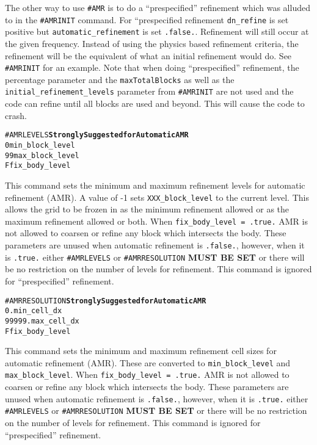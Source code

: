 The other way to use {\tt \#AMR} is to do a ``prespecified'' refinement which was
alluded to in the {\tt \#AMRINIT} command.  For ``prespecified refinement 
 {\tt dn\_refine} is set positive but
{\tt automatic\_refinement} is set {\tt .false.}. Refinement will still occur at the
given frequency.  Instead of using the physics based refinement criteria, the
refinement will be the equivalent of what an initial refinement would do. See {\tt \#AMRINIT}
for an example.  Note that when doing ``prespecified'' refinement, the percentage
parameter and the {\tt maxTotalBlocks} as well as the  {\tt initial\_refinement\_levels}
parameter from {\tt \#AMRINIT} are not used and the code can refine until all blocks
are used and beyond.  This will cause the code to crash.
 \ \ \\


\begin{alltt}
#AMRLEVELS          \hfill {\bf Strongly Suggested for Automatic AMR}
0                      min_block_level
99                     max_block_level
F                      fix_body_level
\end{alltt}

This command sets the minimum and maximum refinement levels for 
automatic refinement (AMR).  A value of -1 sets {\tt XXX\_block\_level} to
the current level.  This allows the grid to be frozen in as the minimum 
refinement allowed or as the maximum refinement allowed or both.
When {\tt fix\_body\_level = .true.} AMR is not allowed to coarsen or 
refine any block which intersects the body.  These parameters are unused
when automatic refinement is {\tt .false.}, however, when it is {\tt .true.}
either {\tt \#AMRLEVELS} or {\tt \#AMRRESOLUTION} {\bf MUST BE SET}
or there will be no restriction on the number of levels for refinement.
This command is ignored for ``prespecified'' refinement.
\ \ \\


\begin{alltt}
#AMRRESOLUTION     \hfill {\bf Strongly Suggested for Automatic AMR}
0.                     min_cell_dx
99999.                 max_cell_dx
F                      fix_body_level
\end{alltt}

This command sets the minimum and maximum refinement cell sizes for 
automatic refinement (AMR).  These are converted to {\tt min\_block\_level}
and {\tt max\_block\_level}.
When {\tt fix\_body\_level = .true.} AMR is not allowed to coarsen or 
refine any block which intersects the body.  These parameters are unused
when automatic refinement is {\tt .false.}, however, when it is {\tt .true.}
either {\tt \#AMRLEVELS} or {\tt \#AMRRESOLUTION} {\bf MUST BE SET}
or there will be no restriction on the number of levels for refinement.
This command is ignored for ``prespecified'' refinement.
\ \ \\

